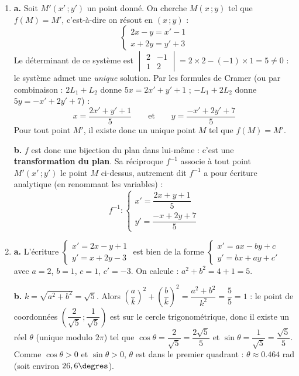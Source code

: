 \documentclass[11pt]{article}
\begin{document}
\begin{corrige}
\begin{enumerate}
\item \textbf{a.} Soit $M'(x'\,;y')$ un point donné. On cherche $M(x\,;y)$ tel que $f(M) = M'$, c'est-à-dire on résout en $(x\,;y)$ :
\[ \begin{cases} 2x - y = x' - 1 \\ x + 2y = y' + 3 \end{cases} \]
Le déterminant de ce système est $\begin{vmatrix} 2 & -1 \\ 1 & 2 \end{vmatrix} = 2 \times 2 - (-1) \times 1 = 5 \neq 0$ : le système admet une \emph{unique} solution. Par les formules de Cramer (ou par combinaison : $2L_1 + L_2$ donne $5x = 2x' + y' + 1$ ; $-L_1 + 2L_2$ donne $5y = -x' + 2y' + 7$) :
\[ x = \dfrac{2x' + y' + 1}{5} \qquad \text{et} \qquad y = \dfrac{-x' + 2y' + 7}{5} \]
Pour tout point $M'$, il existe donc un unique point $M$ tel que $f(M) = M'$.

\textbf{b.} $f$ est donc une bijection du plan dans lui-même : c'est une \textbf{transformation du plan}. Sa réciproque $f^{-1}$ associe à tout point $M'(x'\,;y')$ le point $M$ ci-dessus, autrement dit $f^{-1}$ a pour écriture analytique (en renommant les variables) :
\[ f^{-1} : \begin{cases} x' = \dfrac{2x + y + 1}{5} \\[2mm] y' = \dfrac{-x + 2y + 7}{5} \end{cases} \]

\item \textbf{a.} L'écriture $\begin{cases} x' = 2x - y + 1 \\ y' = x + 2y - 3 \end{cases}$ est bien de la forme $\begin{cases} x' = ax - by + c \\ y' = bx + ay + c' \end{cases}$ avec $a = 2$, $b = 1$, $c = 1$, $c' = -3$. On calcule : $a^2 + b^2 = 4 + 1 = 5$.

\textbf{b.} $k = \sqrt{a^2+b^2} = \sqrt{5}$. Alors $\left(\dfrac{a}{k}\right)^2 + \left(\dfrac{b}{k}\right)^2 = \dfrac{a^2+b^2}{k^2} = \dfrac{5}{5} = 1$ : le point de coordonnées $\left(\dfrac{2}{\sqrt{5}}\,;\dfrac{1}{\sqrt{5}}\right)$ est sur le cercle trigonométrique, donc il existe un réel $\theta$ (unique modulo $2\pi$) tel que $\cos\theta = \dfrac{2}{\sqrt{5}} = \dfrac{2\sqrt{5}}{5}$ et $\sin\theta = \dfrac{1}{\sqrt{5}} = \dfrac{\sqrt{5}}{5}$. Comme $\cos\theta > 0$ et $\sin\theta > 0$, $\theta$ est dans le premier quadrant : $\theta \approx \num{0,464}$ rad (soit environ $26,6\degres$).


\end{enumerate}
\end{corrige}
\end{document}
